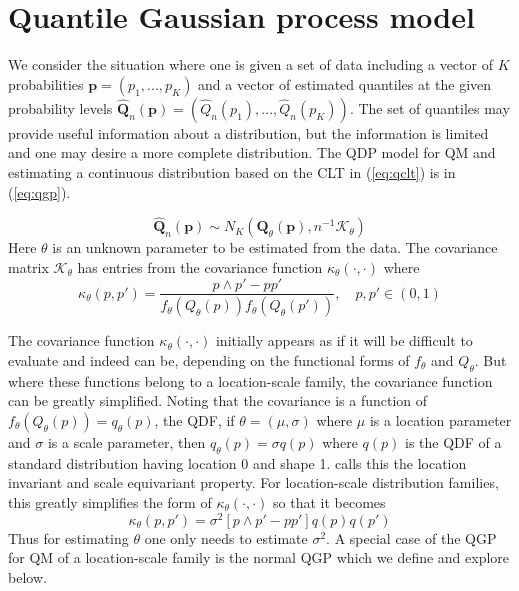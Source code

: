 \documentclass[preprint,12pt,authoryear]{elsarticle}
\begin{document}
\section{Quantile Gaussian process model} \label{sec:qgp_model}

We consider the situation where one is given a set of data including a vector of $K$ probabilities $\boldsymbol{p} = (p_1, ..., p_K)$ and a vector of estimated quantiles at the given probability levels $\hat{\boldsymbol{Q}}_n(\boldsymbol{p}) = (\hat{Q}_n(p_1), ..., \hat{Q}_n(p_K))$. 
The set of quantiles may provide useful information about a distribution, but the information is limited and one may desire a more complete distribution.
The QDP model for QM and estimating a continuous distribution based on the CLT in (\ref{eq:qclt}) is in (\ref{eq:qgp}).



\begin{equation}
    \label{eq:qgp}
\hat{\boldsymbol{Q}}_n(\boldsymbol{p}) \sim N_K(\boldsymbol{Q}_{\theta}(\boldsymbol{p}), n^{-1} \boldsymbol{\mathcal{K}}_{\theta})
\end{equation}
Here $\theta$ is an unknown parameter to be estimated from the data. The covariance matrix $\boldsymbol{\mathcal{K}}_{\theta}$ has entries from the covariance function $\kappa_{\theta}(\cdot, \cdot)$ where 
\[
\kappa_{\theta}(p, p') = \frac{p\wedge p' - p p'}{f_{\theta}(Q_{\theta}(p)) f_{\theta}(Q_{\theta}(p'))}, \quad p, p' \in (0,1)
\]

The covariance function $\kappa_{\theta} (\cdot, \cdot)$ initially appears as if it will be difficult to evaluate and indeed can be, depending on the functional forms of $f_{\theta}$ and $Q_{\theta}$. But where these functions belong to a location-scale family, the covariance function can be greatly simplified. 
Noting that the covariance is a function of $f_{\theta}(Q_{\theta}(p)) = q_{\theta}(p)$, the QDF, if $\theta = (\mu, \sigma)$ where $\mu$ is a location parameter and $\sigma$ is a scale parameter, then $q_{\theta}(p) = \sigma q(p)$ where $q(p)$ is the QDF of a standard distribution having location 0 and shape 1. \cite{staudte2017shapes} calls this the location invariant and scale equivariant property. For location-scale distribution families, this greatly simplifies the form of $\kappa_{\theta}(\cdot,\cdot)$ so that it becomes
\[
    \kappa_{\theta}(p, p') = \sigma^{2}[p\wedge p' - p p'] q(p)q(p') 
\] 
Thus for estimating $\theta$ one only needs to estimate $\sigma^2$. A special case of the QGP for QM of a location-scale family is the normal QGP which we define and explore below.
\end{document}
